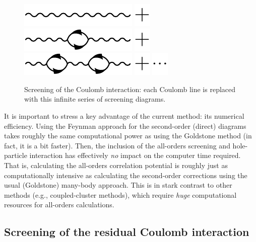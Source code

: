 \documentclass[10pt,twocolumn,a4paper]{article}%
\begin{document}
\begin{figure}%
\centering
\includegraphics[height=0.025\textwidth]{img/Sigma/CoulombScreening0}
\includegraphics[height=0.025\textwidth]{img/Sigma/plus}
\includegraphics[height=0.025\textwidth]{img/Sigma/CoulombScreening1}
\includegraphics[height=0.025\textwidth]{img/Sigma/plus}
\includegraphics[height=0.025\textwidth]{img/Sigma/CoulombScreening2}
\includegraphics[height=0.025\textwidth]{img/Sigma/plus}
\includegraphics[height=0.025\textwidth]{img/Sigma/dotdotdot}
\caption{\label{fig:Screening}\small Screening of the Coulomb interaction: each Coulomb line is replaced with this infinite series of screening diagrams.}
\end{figure}



It is important to stress a key advantage of the current method: its numerical efficiency.
Using the Feynman approach for the second-order (direct) diagrams takes roughly the same computational power as using the Goldstone method (in fact, it is a bit faster).
Then, the inclusion of the all-orders screening and hole-particle interaction has effectively {\em no} impact on the computer time required.
That is, calculating the all-orders correlation potential is roughly just as computationally intensive as calculating the second-order  corrections using the usual (Goldstone) many-body approach.
This is in stark contrast to other methods (e.g., coupled-cluster methods), which require {\em huge} computational resources for all-orders calculations.


\subsection{Screening of the residual Coulomb interaction}
\end{document}
